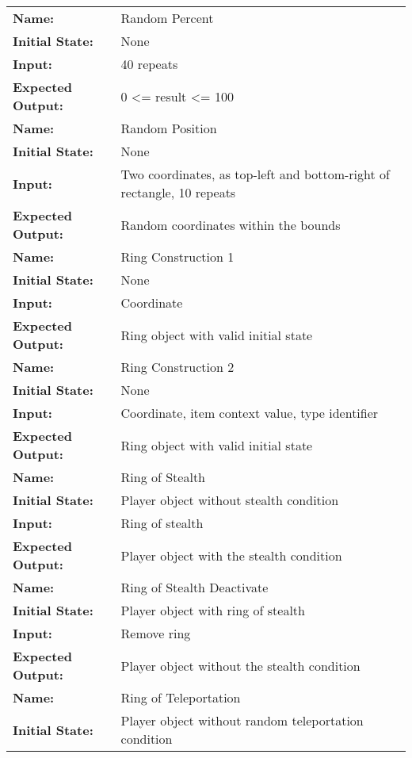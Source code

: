 \documentclass[12pt, titlepage]{article}
\begin{document}
\begin{center}
\begin{longtable}{ l | p{10cm} }
				\hline
				\rule{0pt}{1.5em}\textbf{Name:} & Random Percent\\
				\textbf{Initial State:} & None\\
				\textbf{Input:} & 40 repeats\\
				\textbf{Expected Output:} & 0 <= result <= 100\\[0.6em]
				\hline
				\rule{0pt}{1.5em}\textbf{Name:} & Random Position\\
				\textbf{Initial State:} & None\\
				\textbf{Input:} & Two coordinates, as top-left and bottom-right of rectangle, 10 repeats\\
				\textbf{Expected Output:} & Random coordinates within the bounds\\[0.6em]
				\hline
				\rule{0pt}{1.5em}\textbf{Name:} & Ring Construction 1\\
				\textbf{Initial State:} & None\\
				\textbf{Input:} & Coordinate\\
				\textbf{Expected Output:} & Ring object with valid initial state\\[0.6em]
				\hline
				\rule{0pt}{1.5em}\textbf{Name:} & Ring Construction 2\\
				\textbf{Initial State:} & None\\
				\textbf{Input:} & Coordinate, item context value, type identifier\\
				\textbf{Expected Output:} & Ring object with valid initial state\\[0.6em]
				\hline
				\rule{0pt}{1.5em}\textbf{Name:} & Ring of Stealth\\
				\textbf{Initial State:} & Player object without stealth condition\\
				\textbf{Input:} & Ring of stealth\\
				\textbf{Expected Output:} & Player object with the stealth condition\\[0.6em]
				\hline
				\rule{0pt}{1.5em}\textbf{Name:} & Ring of Stealth Deactivate\\
				\textbf{Initial State:} & Player object with ring of stealth\\
				\textbf{Input:} & Remove ring\\
				\textbf{Expected Output:} & Player object without the stealth condition\\[0.6em]
				\hline
				\rule{0pt}{1.5em}\textbf{Name:} & Ring of Teleportation\\
				\textbf{Initial State:} & Player object without random teleportation condition\\

\end{longtable}
\end{center}
\end{document}
